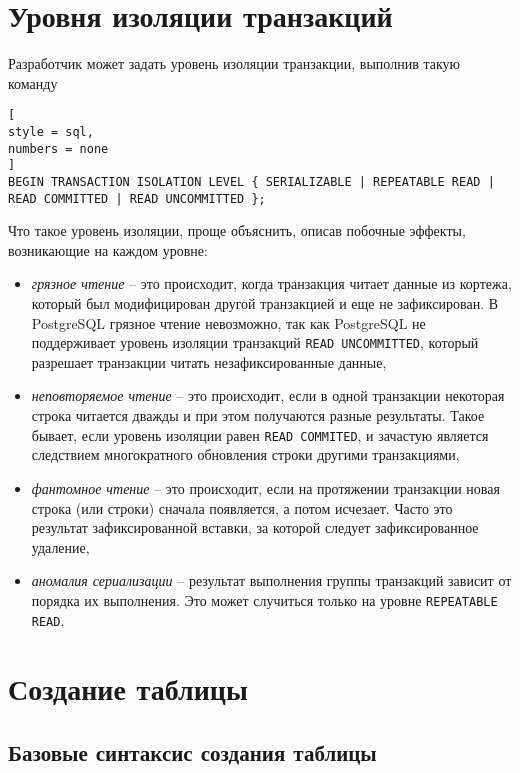 \documentclass[%
	11pt,
	a4paper,
	utf8,
		]{article}
\begin{document}
\section{Уровня изоляции транзакций}

Разработчик может задать уровень изоляции транзакции, выполнив такую команду 
\begin{lstlisting}[
style = sql,
numbers = none
]
BEGIN TRANSACTION ISOLATION LEVEL { SERIALIZABLE | REPEATABLE READ | READ COMMITTED | READ UNCOMMITTED };
\end{lstlisting}

Что такое уровень изоляции, проще объяснить, описав побочные эффекты, возникающие на каждом уровне:
\begin{itemize}
	\item \emph{грязное чтение} -- это происходит, когда транзакция читает данные из кортежа, который был модифицирован другой транзакцией и еще не зафиксирован. В PostgreSQL грязное чтение невозможно, так как PostgreSQL не поддерживает уровень изоляции транзакций \texttt{READ UNCOMMITTED}, который разрешает транзакции читать незафиксированные данные,
	
	\item \emph{неповторяемое чтение} -- это происходит, если в одной транзакции некоторая строка читается дважды и при этом получаются разные результаты. Такое бывает, если уровень изоляции равен \texttt{READ COMMITED}, и зачастую является следствием многократного обновления строки другими транзакциями,
	
	\item \emph{фантомное чтение} -- это происходит, если на протяжении транзакции новая строка (или строки) сначала появляется, а потом исчезает. Часто это результат зафиксированной вставки, за которой следует зафиксированное удаление,
	
	\item \emph{аномалия сериализации} -- результат выполнения группы транзакций зависит от порядка их выполнения. Это может случиться только на уровне \texttt{REPEATABLE READ}.
\end{itemize}



\section{Создание таблицы}

\subsection{Базовые синтаксис создания таблицы}
\end{document}
